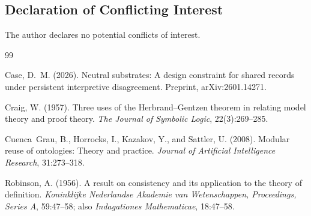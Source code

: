 \documentclass[11pt]{article}
\theoremstyle{plain}
\theoremstyle{definition}
\theoremstyle{remark}
\begin{document}
\subsection*{Declaration of Conflicting Interest}
The author declares no potential conflicts of interest.

\begin{thebibliography}{99}

  Case, D.~M. (2026).
  Neutral substrates: A design constraint for shared records under persistent
  interpretive disagreement.
  Preprint, arXiv:2601.14271.

  Craig, W. (1957).
  Three uses of the Herbrand--Gentzen theorem in relating model theory and
  proof theory.
  \emph{The Journal of Symbolic Logic}, 22(3):269--285.

  Cuenca~Grau, B., Horrocks, I., Kazakov, Y., and Sattler, U. (2008).
  Modular reuse of ontologies: Theory and practice.
  \emph{Journal of Artificial Intelligence Research}, 31:273--318.

  Robinson, A. (1956).
  A result on consistency and its application to the theory of definition.
  \emph{Koninklijke Nederlandse Akademie van Wetenschappen, Proceedings,
    Series A}, 59:47--58; also \emph{Indagationes Mathematicae}, 18:47--58.

\end{thebibliography}
\end{document}
